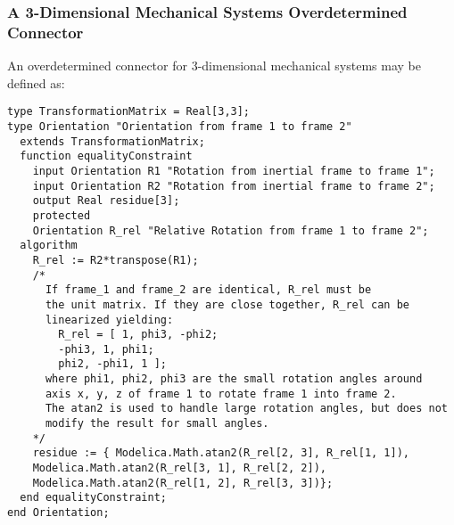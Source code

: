 \subsubsection{A 3-Dimensional Mechanical Systems Overdetermined Connector}\label{an-overdetermined-connector-for-3-dimensional-mechanical-systems}\label{a-3-dimensional-mechanical-systems-overdetermined-connector}

\begin{nonnormative}
An overdetermined connector for 3-dimensional mechanical systems may be defined as:
\begin{lstlisting}[language=modelica]
type TransformationMatrix = Real[3,3];
type Orientation "Orientation from frame 1 to frame 2"
  extends TransformationMatrix;
  function equalityConstraint
    input Orientation R1 "Rotation from inertial frame to frame 1";
    input Orientation R2 "Rotation from inertial frame to frame 2";
    output Real residue[3];
    protected
    Orientation R_rel "Relative Rotation from frame 1 to frame 2";
  algorithm
    R_rel := R2*transpose(R1);
    /*
      If frame_1 and frame_2 are identical, R_rel must be
      the unit matrix. If they are close together, R_rel can be
      linearized yielding:
        R_rel = [ 1, phi3, -phi2;
        -phi3, 1, phi1;
        phi2, -phi1, 1 ];
      where phi1, phi2, phi3 are the small rotation angles around
      axis x, y, z of frame 1 to rotate frame 1 into frame 2.
      The atan2 is used to handle large rotation angles, but does not
      modify the result for small angles.
    */
    residue := { Modelica.Math.atan2(R_rel[2, 3], R_rel[1, 1]),
    Modelica.Math.atan2(R_rel[3, 1], R_rel[2, 2]),
    Modelica.Math.atan2(R_rel[1, 2], R_rel[3, 3])};
  end equalityConstraint;
end Orientation;


\end{lstlisting}
\end{nonnormative}
